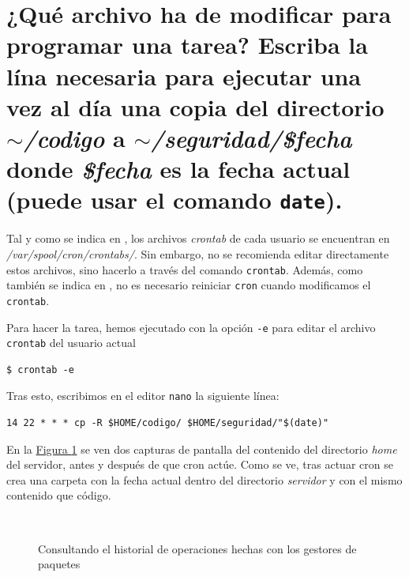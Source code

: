 \documentclass[10pt,a4paper,spanish]{article}
\numberwithin{equation}{section} %
\numberwithin{figure}{section} %
\numberwithin{table}{section} %
\begin{document}
\section{¿Qué archivo ha de modificar para programar una tarea? Escriba la lína necesaria para ejecutar una vez al día una copia del directorio \textit{$\sim$/codigo} a \textit{$\sim$/seguridad/\$fecha} donde \textit{\$fecha} es la fecha actual (puede usar el comando \texttt{date}).}
Tal y como se indica en \cite{crontab}, los archivos \textit{crontab} de cada usuario se encuentran en \textit{/var/spool/cron/crontabs/}. Sin embargo, no se recomienda editar directamente estos archivos, sino hacerlo a través del comando \texttt{crontab}. Además, como también se indica en \cite{cron}, no es necesario reiniciar \texttt{cron} cuando modificamos el \texttt{crontab}.

Para hacer la tarea, hemos ejecutado con la opción \texttt{-e} para editar el archivo \texttt{crontab} del usuario actual
\begin{verbatim}
$ crontab -e
\end{verbatim}
Tras esto, escribimos en el editor \texttt{nano} la siguiente línea:
\begin{verbatim}
14 22 * * * cp -R $HOME/codigo/ $HOME/seguridad/"$(date)"
\end{verbatim}

En la \hyperref[cronprueba]{Figura \ref*{cronprueba}} se ven dos capturas de pantalla del contenido del directorio \textit{home} del servidor, antes y después de que cron actúe. Como se ve, tras actuar cron se crea una carpeta con la fecha actual dentro del directorio \textit{servidor} y con el mismo contenido que código.

\begin{figure}[!h]
\centering
\mbox {
\qquad
{}
}
\caption{Consultando el historial de operaciones hechas con los gestores de paquetes}
\label{cronprueba}
\end{figure}
\end{document}
